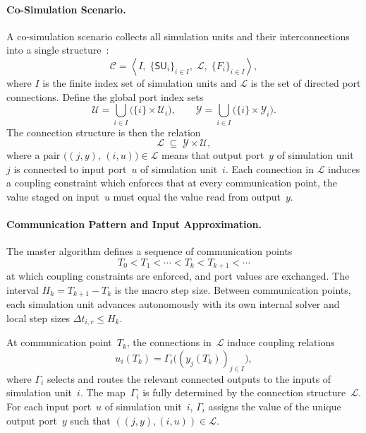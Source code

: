 \paragraph{Co-Simulation Scenario.}
A co-simulation scenario collects all simulation units and their interconnections into a single structure~\cite{gomes_co-simulation_2019}:
\begin{equation}
    \mathcal{C} =
    \left\langle
        I,\;
        \{\mathsf{SU}_i\}_{i \in I},\;
        \mathcal{L},\;
        \{F_i\}_{i \in I}
    \right\rangle,
    \label{eq:cosim_scenario}
\end{equation}
where $I$ is the finite index set of simulation units and $\mathcal{L}$ is the set of directed port connections.
Define the global port index sets
\begin{equation}
    \mathcal{U} = \bigcup_{i \in I} \bigl(\{i\} \times \mathcal{U}_i\bigr),
    \qquad
    \mathcal{Y} = \bigcup_{i \in I} \bigl(\{i\} \times \mathcal{Y}_i\bigr).
\end{equation}
The connection structure is then the relation
\begin{equation}
    \mathcal{L} \;\subseteq\; \mathcal{Y} \times \mathcal{U},
\end{equation}
where a pair $\bigl((j, y),\,(i, u)\bigr) \in \mathcal{L}$ means that output port~$y$ of simulation unit~$j$ is connected to input port~$u$ of simulation unit~$i$.
Each connection in $\mathcal{L}$ induces a coupling constraint which enforces that at every communication point, the value staged on input~$u$ must equal the value read from output~$y$.

\paragraph{Communication Pattern and Input Approximation.}
The master algorithm defines a sequence of communication points
\begin{equation}
    T_0 < T_1 < \cdots < T_k < T_{k+1} < \cdots
\end{equation}
at which coupling constraints are enforced, and port values are exchanged.
The interval $H_k = T_{k+1} - T_k$ is the macro step size.
Between communication points, each simulation unit advances autonomously with its own internal solver and local step sizes $\Delta t_{i,r} \leq H_k$.

At communication point~$T_k$, the connections in~$\mathcal{L}$ induce coupling relations
\begin{equation}
    u_i(T_k) = \Gamma_i\!\bigl((y_j(T_k))_{j \in I}\bigr),
    \label{eq:cosim_coupling}
\end{equation}
where $\Gamma_i$ selects and routes the relevant connected outputs to the inputs of simulation unit~$i$.
The map~$\Gamma_i$ is fully determined by the connection structure~$\mathcal{L}$.
For each input port~$u$ of simulation unit~$i$, $\Gamma_i$ assigns the value of the unique output port~$y$ such that $((j,y),(i,u)) \in \mathcal{L}$.

